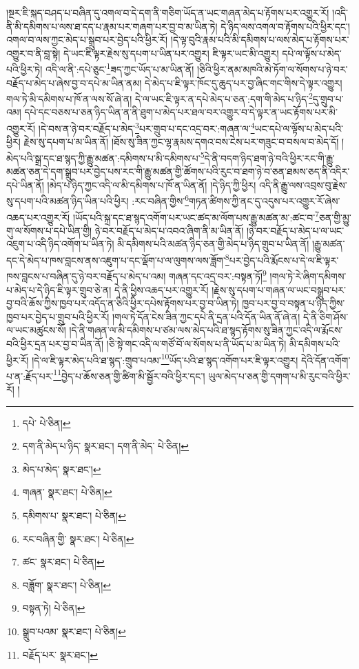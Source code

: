 །སྔར་ཇི་སྐད་བཤད་པ་བཞིན་དུ་འགལ་བ་དེ་དག་ནི་གཅིག་ཡོད་ན་ཡང་གཞན་མེད་པ་རྟོགས་པར་འགྱུར་རོ། །འདི་ནི་མི་དམིགས་པ་ལས་ཐ་དད་པ་རྣམ་པར་གཞག་པར་བྱ་བ་མ་ཡིན་ཏེ། དེ་ཉིད་ལས་འགལ་བ་རྟོགས་པའི་ཕྱིར་དང་། འགལ་བ་ལས་ཀྱང་མེད་པ་སྒྲུབ་པར་བྱེད་པའི་ཕྱིར་རོ། །དེ་ལྟ་བུའི་རྣམ་པའི་མི་དམིགས་པ་ལས་མེད་པ་རྟོགས་པར་འགྱུར་བ་ནི་བླ་སྟེ། དེ་ཡང་ཇི་ལྟར་རྗེས་སུ་དཔག་པ་ཡིན་པར་འགྱུར། ཇི་ལྟར་ཡང་མི་འགྱུར། དཔེ་ལ་ལྟོས་པ་མེད་པའི་ཕྱིར་ཏེ། འདི་ལ་ནི་:དཔེ་ཅུང་\footnote{དཔེ་  པེ་ཅིན། }ཟད་ཀྱང་ཡོད་པ་མ་ཡིན་ནོ། །ཅིའི་ཕྱིར་ནམ་མཁའི་མེ་ཏོག་ལ་སོགས་པ་ཉེ་བར་བརྗོད་པ་མེད་པ་ཞེས་བྱ་བ་དཔེ་མ་ཡིན་ནམ། དེ་མེད་པ་ཇི་ལྟར་ཁོང་དུ་ཆུད་པར་བྱ་ཞིང་གང་གིས་དེ་ལྟར་འགྱུར། གལ་ཏེ་མི་དམིགས་པ་ཁོ་ན་ལས་སོ་ཞེ་ན། དེ་ལ་ཡང་ཇི་ལྟར་ན་དཔེ་མེད་པ་ཅན་:དག་གི་མེད་པ་ཉིད་\footnote{དག་ནི་མེད་པ་ཉིད་  སྣར་ཐང་། དག་ནི་མེད་  པེ་ཅིན། }དུ་གྲུབ་པ་འམ། དཔེ་དང་བཅས་པ་ཅན་ཉིད་ཡིན་ན་ནི་ཐུག་པ་མེད་པར་ཐལ་བར་འགྱུར་བ་དེ་ལྟར་ན་ཡང་རྟོགས་པར་མི་འགྱུར་རོ། །དེ་བས་ན་ཉེ་བར་བརྗོད་པ་མེད་\footnote{མེད་པ་མེད་  སྣར་ཐང་། }པར་གྲུབ་པ་དང་འདྲ་བར་:གཞན་ལ་\footnote{གཞན་  སྣར་ཐང་།  པེ་ཅིན། }ཡང་དཔེ་ལ་ལྟོས་པ་མེད་པའི་ཕྱིར། རྗེས་སུ་དཔག་པ་མ་ཡིན་ནོ། །ཐོས་སུ་ཟིན་ཀྱང་ལྷ་རྣམས་དགའ་བས་ངེས་པར་གཟུང་བ་བསལ་བ་མེད་དོ། །མེད་པའི་སྒྲ་དང་ཐ་སྙད་ཀྱི་རྒྱུ་མཚན་:དམིགས་པ་མི་དམིགས་པ་\footnote{དམིགས་པ་  སྣར་ཐང་།  པེ་ཅིན། }དེ་ནི་བདག་ཉིད་ཐག་ཉེ་བའི་ཕྱིར་རང་གི་རྒྱུ་མཚན་ཅན་དེ་དག་སྒྲུབ་པར་བྱེད་པས་རང་གི་རྒྱུ་མཚན་གྱི་ཚོགས་པའི་རུང་བ་ཐག་ཉེ་བ་ཅན་ཐམས་ཅད་ནི་འདིར་དཔེ་ཡིན་ནོ། །མེད་པ་ཉིད་ཀྱང་འདི་ལ་མི་དམིགས་པ་ཁོ་ན་ཡིན་ནོ། །དེ་ཉིད་ཀྱི་ཕྱིར། འདི་ནི་རྒྱུ་ལས་འབྲས་བུ་རྗེས་སུ་དཔག་པའི་མཚན་ཉིད་ཡིན་པའི་ཕྱིར། :རང་བཞིན་གྱིས་\footnote{རང་བཞིན་གྱི་  སྣར་ཐང་།  པེ་ཅིན། }གཏན་ཚིགས་ཀྱི་ནང་དུ་འདུས་པར་འགྱུར་རོ་ཞེས་འཆད་པར་འགྱུར་རོ། །ཡོད་པའི་སྐྲ་དང་ཐ་སྙད་འགོག་པར་ཡང་ཚད་མ་ལོག་པས་རྒྱུ་མཚན་མ་:ཚང་བ་\footnote{ཚང་  སྣར་ཐང་།  པེ་ཅིན། }ཅན་གྱི་མྱུ་གུ་ལ་སོགས་པ་དཔེ་ཡིན་གྱི། ཉེ་བར་བརྗོད་པ་མེད་པ་འབའ་ཞིག་ནི་མ་ཡིན་ནོ། །ཉེ་བར་བརྗོད་པ་མེད་པ་ལ་ཡང་འཇུག་པ་འདི་ཉིད་འགོག་པ་ཡིན་ཏེ། མི་དམིགས་པའི་མཚན་ཉིད་ཅན་གྱི་མེད་པ་ཉིད་གྲུབ་པ་ཡིན་ནོ། །རྒྱུ་མཚན་དང་དེ་མེད་པ་ཁས་བླངས་ནས་འཇུག་པ་དང་ལྡོག་པ་ལ་ལུགས་ལས་ཟློག་\footnote{བཟློག་  སྣར་ཐང་།  པེ་ཅིན། }པར་བྱེད་པའི་རྨོངས་པ་དེ་ལ་ཇི་ལྟར་ཁས་བླངས་པ་བཞིན་དུ་ཉེ་བར་བརྗོད་པ་མེད་པ་འམ། གཞན་དང་འདྲ་བར་:བསྟན་ཏོ།\footnote{བསྟན་ཏེ།  པེ་ཅིན། } །གལ་ཏེ་རེ་ཞིག་དམིགས་པ་མེད་པ་དེ་ཉིད་ཇི་ལྟར་གྲུབ་ཅེ་ན། དེ་ནི་ཕྱིས་འཆད་པར་འགྱུར་རོ། །རྗེས་སུ་དཔག་པ་གཞན་ལ་ཡང་བསྒྲུབ་པར་བྱ་བའི་ཆོས་ཀྱིས་ཁྱབ་པར་འདོད་ན་ཅིའི་ཕྱིར་དཔེས་རྟོགས་པར་བྱ་བ་ཡིན་ཏེ། ཁྱབ་པར་བྱ་བ་བསྟན་པ་ཉིད་ཀྱིས་ཁྱབ་པར་བྱེད་པ་གྲུབ་པའི་ཕྱིར་རོ། །གལ་ཏེ་དོན་ངེས་ཟིན་ཀྱང་དཔེ་ནི་དྲན་པའི་དོན་ཡིན་ནོ་ཞེ་ན། དེ་ནི་ཅིག་ཤོས་ལ་ཡང་མཚུངས་སོ། །དེ་ནི་གཞན་ལ་མི་དམིགས་པ་ཙམ་ལས་མེད་པའི་ཐ་སྙད་རྟོགས་སུ་ཟིན་ཀྱང་འདི་ལ་རྨོངས་བའི་ཕྱིར་དྲན་པར་བྱ་བ་ཡིན་ནོ། །ཅི་སྟེ་གང་འདི་ལ་གཙོ་བོ་ལ་སོགས་པ་ནི་ཡོད་པ་མ་ཡིན་ཏེ། མི་དམིགས་པའི་ཕྱིར་རོ། །དེ་ལ་ཇི་ལྟར་མེད་པའི་ཐ་སྙད་:གྲུབ་པའམ་\footnote{སྒྲུབ་པའམ་  སྣར་ཐང་།  པེ་ཅིན། }ཡོད་པའི་ཐ་སྙད་འགོག་པར་ཇི་ལྟར་འགྱུར། དེའི་དོན་འགོག་པ་ན་:རྗོད་པར་\footnote{བརྗོད་པར་  སྣར་ཐང་། }བྱེད་པ་ཆོས་ཅན་གྱི་ཚིག་མི་སྦྱོར་བའི་ཕྱིར་དང་། ཡུལ་མེད་པ་ཅན་གྱི་དགག་པ་མི་རུང་བའི་ཕྱིར་རོ། །
